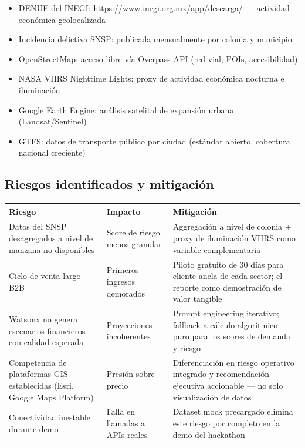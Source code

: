 \documentclass[12pt,a4paper]{article}
\begin{document}
\begin{itemize}[leftmargin=1.5cm, itemsep=3pt]
  \item DENUE del INEGI: \url{https://www.inegi.org.mx/app/descarga/} — actividad económica geolocalizada
  \item Incidencia delictiva SNSP: publicada mensualmente por colonia y municipio
  \item OpenStreetMap: acceso libre vía Overpass API (red vial, POIs, accesibilidad)
  \item NASA VIIRS Nighttime Lights: proxy de actividad económica nocturna e iluminación
  \item Google Earth Engine: análisis satelital de expansión urbana (Landsat/Sentinel)
  \item GTFS: datos de transporte público por ciudad (estándar abierto, cobertura nacional creciente)
\end{itemize}

\subsection{Riesgos identificados y mitigación}

\begin{table}[H]
\centering
\small
\renewcommand{\arraystretch}{1.3}
\begin{tabularx}{\textwidth}{X X X}
\toprule
\rowcolor{grisoscuro}
\color{white}\textbf{Riesgo} & \color{white}\textbf{Impacto} & \color{white}\textbf{Mitigación} \\
\midrule
Datos del SNSP desagregados a nivel de manzana no disponibles & Score de riesgo menos granular & Aggregación a nivel de colonia + proxy de iluminación VIIRS como variable complementaria \\
\rowcolor{fondofila}
Ciclo de venta largo B2B & Primeros ingresos demorados & Piloto gratuito de 30 días para cliente ancla de cada sector; el reporte como demostración de valor tangible \\
Watsonx no genera escenarios financieros con calidad esperada & Proyecciones incoherentes & Prompt engineering iterativo; fallback a cálculo algorítmico puro para los scores de demanda y riesgo \\
\rowcolor{fondofila}
Competencia de plataformas GIS establecidas (Esri, Google Maps Platform) & Presión sobre precio & Diferenciación en riesgo operativo integrado y recomendación ejecutiva accionable — no solo visualización de datos \\
Conectividad inestable durante demo & Falla en llamadas a APIs reales & Dataset mock precargado elimina este riesgo por completo en la demo del hackathon \\
\bottomrule
\end{tabularx}
\end{table}
\end{document}

